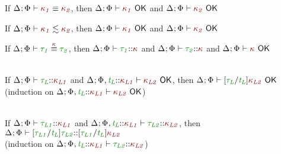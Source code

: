 \documentclass[11pt]{article}
\begin{document}
    \begin{lemma}[OK-KEquiv]
        If $\KindEquiv{\knd[1]}{\knd[2]}$, then $\KindWellFormed[{\knd[1]}]$ and $\KindWellFormed[{\knd[2]}]$
    \end{lemma}
    \begin{lemma}[OK-CSK]
        If $\ConsistentSubKind{\knd[1]}{\knd[2]}$, then $\KindWellFormed[{\knd[1]}]$ and $\KindWellFormed[{\knd[2]}]$
    \end{lemma}
    \begin{lemma}[OK-EquivAK]
        If $\TypeEquivAtKind{\typ[1]}{\typ[2]}$, then $\WellFormedAtKind{\typ[1]}$ and $\WellFormedAtKind{\typ[2]}$ and $\KindWellFormed$
    \end{lemma}
    \begin{lemma}[OK-Substitution]
        \vphantom{.}\\
        If $\WellFormedAtKind{\typ[L]}[\knd[L1]]$ and $\KindWellFormed[{\knd[L2]}][\HoleCtx\ExtendTypVarCtx[][L][{\knd[L1]}]]$, then $\KindWellFormed[\subst{\typ[L]}{\typvar[L]}{\knd[L2]}]$ \\
        (induction on $\KindWellFormed[{\knd[L2]}][\HoleCtx\ExtendTypVarCtx[][L][{\knd[L1]}]]$)
    \end{lemma}
    \begin{lemma}[K-Substitution]
        \vphantom{.}\\
        If $\WellFormedAtKind{\typ[L1]}[\knd[L1]]$ and $\WellFormedAtKind[\HoleCtx\ExtendTypVarCtx[][L][{\knd[L1]}]]{\typ[L2]}[\knd[L2]]$, then $\WellFormedAtKind{\subst{\typ[L1]}{\typvar[L]}{\typ[L2]}}[\subst{\typ[L1]}{\typvar[L]}{\knd[L2]}]$ \\
        (induction on $\WellFormedAtKind[\HoleCtx\ExtendTypVarCtx[][L][{\knd[L1]}]]{\typ[L2]}[\knd[L2]]$)
    \end{lemma}
\end{document}
